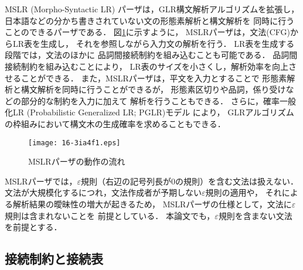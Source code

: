 \documentclass[japanese]{jnlp_1.4}
\begin{document}
MSLR (Morpho-Syntactic LR) パーザは，GLR構文解析アルゴリズムを拡張し，
日本語などの分かち書きされていない文の形態素解析と構文解析を
同時に行うことのできるパーザである．
図\ref{fig:mslr}に示すように，
MSLRパーザは，文法(CFG)からLR表を生成し，
それを参照しながら入力文の解析を行う．
LR表を生成する段階では，文法のほかに
品詞間接続制約を組み込むことも可能である．
品詞間接続制約を組み込むことにより，
LR表のサイズを小さくし，解析効率を向上させることができる．
また，MSLRパーザは，平文を入力とすることで
形態素解析と構文解析を同時に行うことができるが，
形態素区切りや品詞，係り受けなどの部分的な制約を入力に加えて
解析を行うこともできる．
さらに，確率一般化LR (Probabilistic Generalized LR; PGLR)モデル
\cite{inui:00} により，
GLRアルゴリズムの枠組みにおいて構文木の生成確率を求めることもできる．

\begin{figure}[t]
\begin{center}
\texttt{[image: 16-3ia4f1.eps]}
\end{center}
\caption{MSLRパーザの動作の流れ}
\label{fig:mslr}
\end{figure}

MSLRパーザでは，$\varepsilon$規則（右辺の記号列長が0の規則）を含む文法は扱えない．
文法が大規模化するにつれ，文法作成者が予期しない$\varepsilon$規則の適用や，
それによる解析結果の曖昧性の増大が起きるため，
MSLRパーザの仕様として，文法に$\varepsilon$規則は含まれないことを
前提としている．
本論文でも，$\varepsilon$規則を含まない文法を前提とする．


\subsection{接続制約と接続表}
\end{document}
